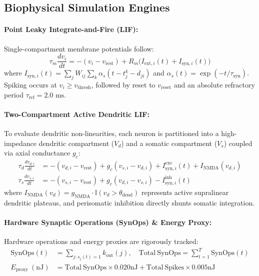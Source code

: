 \documentclass[10pt,twocolumn,letterpaper]{article}
\begin{document}
\subsection{Biophysical Simulation Engines}

\paragraph{Point Leaky Integrate-and-Fire (LIF):}
Single-compartment membrane potentials follow:
\begin{equation}
\tau_m \frac{dv_i}{dt} = -(v_i - v_{\mathrm{rest}}) + R_m \big( I_{\mathrm{ext}, i}(t) + I_{\mathrm{syn}, i}(t) \big)
\end{equation}
where $I_{\mathrm{syn}, i}(t) = \sum_j W_{ij} \sum_k \alpha_s(t - t_j^k - d_{ji})$ and $\alpha_s(t) = \exp(-t/\tau_{\mathrm{syn}})$. Spiking occurs at $v_i \ge v_{\mathrm{thresh}}$, followed by reset to $v_{\mathrm{reset}}$ and an absolute refractory period $\tau_{\mathrm{ref}} = 2.0\text{ ms}$.

\paragraph{Two-Compartment Active Dendritic LIF:}
To evaluate dendritic non-linearities, each neuron is partitioned into a high-impedance dendritic compartment ($V_d$) and a somatic compartment ($V_s$) coupled via axial conductance $g_c$:
\begin{align}
\tau_d \frac{dv_{d, i}}{dt} &= -(v_{d, i} - v_{\mathrm{rest}}) + g_c (v_{s, i} - v_{d, i}) + I_{\mathrm{syn}, i}^{\mathrm{exc}}(t) + I_{\mathrm{NMDA}}(v_{d, i}) \\
\tau_s \frac{dv_{s, i}}{dt} &= -(v_{s, i} - v_{\mathrm{rest}}) + g_c (v_{d, i} - v_{s, i}) - I_{\mathrm{syn}, i}^{\mathrm{inh}}(t)
\end{align}
where $I_{\mathrm{NMDA}}(v_d) = g_{\mathrm{NMDA}} \cdot \mathbb{I}(v_d > \theta_{\mathrm{dend}})$ represents active supralinear dendritic plateaus, and perisomatic inhibition directly shunts somatic integration.

\paragraph{Hardware Synaptic Operations (SynOps) \& Energy Proxy:}
Hardware operations and energy proxies are rigorously tracked:
\begin{align}
\mathrm{SynOps}(t) &= \sum_{j: s_j(t)=1} k_{\mathrm{out}}(j), \quad \mathrm{Total\ SynOps} = \sum_{t=1}^T \mathrm{SynOps}(t) \\
E_{\mathrm{proxy}}\ (\mathrm{nJ}) &= \mathrm{Total\ SynOps} \times 0.020\mathrm{ nJ} + \mathrm{Total\ Spikes} \times 0.005\mathrm{ nJ}
\end{align}
\end{document}
